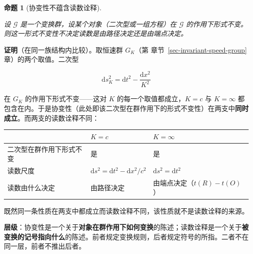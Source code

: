 \documentclass[
  chinese,
  a4paper,
  UTF8,
  12pt,
  oneside,
  openany]{ctexbook}
\newcounter{none} %
\theoremstyle{plain}
\theoremstyle{plain}
\theoremstyle{plain}
\newtheorem{proposition}{命题}[chapter]
\theoremstyle{definition}
\theoremstyle{plain}
\theoremstyle{plain}
\theoremstyle{remark}
\begin{document}
\begin{proposition}[协变性不蕴含读数诠释]\protect\hypertarget{prp-tc-covariance}{}\label{prp-tc-covariance}

设 \(\mathcal{G}\) 是一个变换群，设某个对象（二次型或一组方程）在
\(\mathcal{G}\)
的作用下形式不变。则这一形式不变性不决定读数是由路径决定还是由端点决定。

\end{proposition}

\textbf{证明}（在同一族结构内比较）。取恒速群 \(G_K\)（第
章节~\ref{sec-invariant-speed-group} 章）的两个取值。二次型

\[
\mathrm{d}s^{2}_{K}=\mathrm{d}t^{2}-\frac{\mathrm{d}x^{2}}{K^{2}}
\]

在 \(G_K\) 的作用下形式不变------这对 \(K\) 的每一个取值都成立，\(K=c\)
与 \(K=\infty\)
都包含在内。于是协变性（此处即该二次型在群作用下的形式不变性）在两支中\textbf{同时成立}。而两支的读数诠释不同：

{\def\LTcaptype{none} %
\begin{longtable}[]{@{}
  >{\raggedright\arraybackslash}p{}
  >{\raggedright\arraybackslash}p{}
  >{\raggedright\arraybackslash}p{}@{}}
\toprule\noalign{}
\begin{minipage}[b]{\linewidth}\raggedright
\end{minipage} & \begin{minipage}[b]{\linewidth}\raggedright
\(K=c\)
\end{minipage} & \begin{minipage}[b]{\linewidth}\raggedright
\(K=\infty\)
\end{minipage} \\
\midrule\noalign{}
\endhead
\bottomrule\noalign{}
\endlastfoot
二次型在群作用下形式不变 & 是 & 是 \\
读数尺度 & \(\mathrm{d}s^{2}=\mathrm{d}t^{2}-\mathrm{d}x^{2}/c^{2}\) &
\(\mathrm{d}s^{2}=\mathrm{d}t^{2}\) \\
读数由什么决定 & 由路径决定 & 由端点决定（\(t(R)-t(O)\)） \\
\end{longtable}
}

既然同一条性质在两支中都成立而读数诠释不同，该性质就不是读数诠释的来源。

\textbf{层级}：协变性是一个关于\textbf{对象在群作用下如何变换}的陈述；读数诠释是一个关于\textbf{被变换的记号指向什么}的陈述。前者规定变换规则，后者规定符号的所指。二者不在同一层，前者不推出后者。
\end{document}
